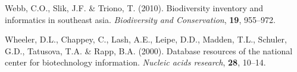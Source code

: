 \documentclass[]{article}
\begin{document}
\leavevmode\hypertarget{ref-webb2010biodiversity}{}%
Webb, C.O., Slik, J.F. \& Triono, T. (2010). Biodiversity inventory and informatics in southeast asia. \emph{Biodiversity and Conservation}, \textbf{19}, 955--972.

\leavevmode\hypertarget{ref-wheeler2000database}{}%
Wheeler, D.L., Chappey, C., Lash, A.E., Leipe, D.D., Madden, T.L., Schuler, G.D., Tatusova, T.A. \& Rapp, B.A. (2000). Database resources of the national center for biotechnology information. \emph{Nucleic acids research}, \textbf{28}, 10--14.
\end{document}
